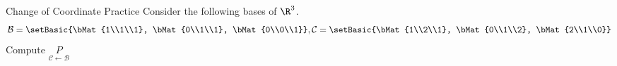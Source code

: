\documentclass[xcoler=dvipsnames, aspectratio=169]{beamer}
\newcommand{\B}{\mathcal{B}}
\newcommand{\C}{\mathcal{C}}
\begin{document}
    \begin{frame}{Change of Coordinate Practice}
        Consider the following bases of $\R^3$.
        \[
            \B = \setBasic{\bMat{1\\1\\1}, \bMat{0\\1\\1}, \bMat{0\\0\\1}},
            \C = \setBasic{\bMat{1\\2\\1}, \bMat{0\\1\\2}, \bMat{2\\1\\0}}
        \]\pause
        Compute $\underset{\C\leftarrow\B}{P}$
        \iftoggle{showSolutions}{
            \pause
            \[
                \underset{\C\leftarrow\B}{P} = \bMat{
                    0 & \frac{1}{2} & -\frac{1}{2}\\
                    \frac{1}{2} & \frac{1}{4} & \frac{3}{4}\\
                    \frac{1}{2} & -\frac{1}{4}& \frac{1}{4}
                }
            \]
        }{
        }
        \vspace{130pt}
    \end{frame}
\end{document}
